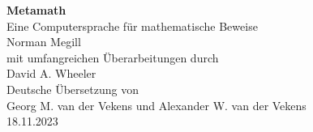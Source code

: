 
\pagestyle{headings}

\thispagestyle{empty}

\hfill
\vfill

\begin{center}
{\LARGE\bf Metamath} \\
\vspace{1ex}
{\large Eine Computersprache für mathematische Beweise} \\
\vspace{7ex}
{\large Norman Megill} \\
\vspace{7ex}
mit umfangreichen Überarbeitungen durch \\
\vspace{1ex}
{\large David A. Wheeler} \\
\vspace{7ex}
Deutsche Übersetzung von \\
\vspace{1ex}
{\large Georg M. van der Vekens und Alexander W. van der Vekens} \\
\vspace{7ex}
18.11.2023
\end{center}

\vfill
\hfill

\newpage
\thispagestyle{empty}

\hfill
\vfill

